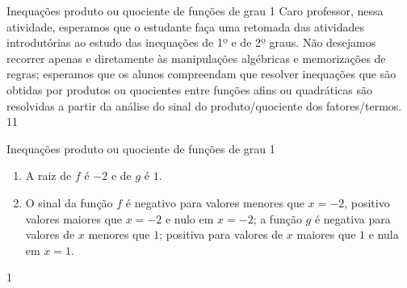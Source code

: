 \cleardoublepage
\def\currentcolor{session1}
\begin{sugestions}{Inequações produto ou quociente de funções de grau 1}
{
Caro professor, nessa atividade, esperamos que o estudante faça uma retomada das atividades introdutórias ao estudo das inequações de 1º e de 2º graus. Não desejamos recorrer apenas e diretamente às manipulações algébricas e memorizações de regras; esperamos que os alunos compreendam que resolver inequações que são obtidas por produtos ou quocientes entre funções afins ou quadráticas são resolvidas a partir da análise do sinal do produto/quociente dos fatores/termos. 
}{1}{1}
\end{sugestions}
\begin{answer}{Inequações produto ou quociente de funções de grau 1}
{\begin{enumerate}
\item A raiz de $f$ é $-2$ e de $g$ é $1$.
\item O sinal da função $f$ é negativo para valores menores que  $x=-2$, positivo valores maiores que $x=-2$ e nulo em $x=-2$;  a função $g$ é negativa para valores de $x$ menores que $1$; positiva para valores de $x$ maiores que $1$ e nula em $x = 1$.
\end{enumerate}
}{1}
\end{answer}
\clearmargin
\clearmargin
